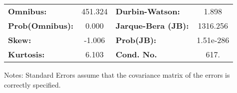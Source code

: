 \begin{center}
\begin{tabular}{lcccccc}
\bottomrule
\end{tabular}
\begin{tabular}{lclc}
\textbf{Omnibus:}       & 451.324 & \textbf{  Durbin-Watson:     } &     1.898  \\
\textbf{Prob(Omnibus):} &   0.000 & \textbf{  Jarque-Bera (JB):  } &  1316.256  \\
\textbf{Skew:}          &  -1.006 & \textbf{  Prob(JB):          } & 1.51e-286  \\
\textbf{Kurtosis:}      &   6.103 & \textbf{  Cond. No.          } &      617.  \\
\bottomrule
\end{tabular}
\end{center}

Notes: \newline
 [1] Standard Errors assume that the covariance matrix of the errors is correctly specified.